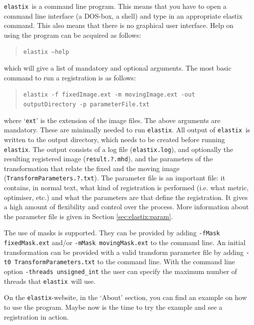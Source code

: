 \documentclass[]{report}
\newcommand{\elastix}{\texttt{elastix}}
\begin{document}
\elastix\ is a command line program. This means that you have to open
a command line interface (a DOS-box, a shell) and type in an
appropriate elastix command. This also means that there is no
graphical user interface. Help on using the program can be acquired
as follows:
\begin{quote}
\texttt{elastix --help}
\end{quote}
which will give a list of mandatory and optional arguments. The most
basic command to run a registration is as follows:
\begin{quote}
\texttt{elastix -f fixedImage.ext -m movingImage.ext -out
outputDirectory -p parameterFile.txt}
\end{quote}
where `\texttt{ext}' is the extension of the image files. The above
arguments are mandatory. These are minimally needed to run \elastix.
All output of \elastix\ is written to the output directory, which
needs to be created before running \elastix. The output consists of a
log file (\texttt{elastix.log}), and optionally the resulting
registered image (\texttt{result.?.mhd}), and the parameters of the
transformation that relate the fixed and the moving image
(\texttt{TransformParameters.?.txt}). The parameter file is an
important file: it contains, in normal text, what kind of
registration is performed (i.e. what metric, optimiser, etc.) and
what the parameters are that define the registration. It gives a high
amount of flexibility and control over the process. More information
about the parameter file is given in Section \ref{sec:elastix:param}.

The use of masks is supported. They can be provided by adding
\texttt{-fMask fixedMask.ext} and/or \texttt{-mMask movingMask.ext}
to the command line. An initial transformation can be provided with a
valid transform parameter file by adding \texttt{-t0
TransformParameters.txt} to the command line. With the command line
option \texttt{-threads unsigned\_int} the user can specify the
maximum number of threads that \elastix\ will use.

On the \elastix-website, in the `About' section, you can find an
example on how to use the program. Maybe now is the time to try the
example and see a registration in action.
\end{document}
